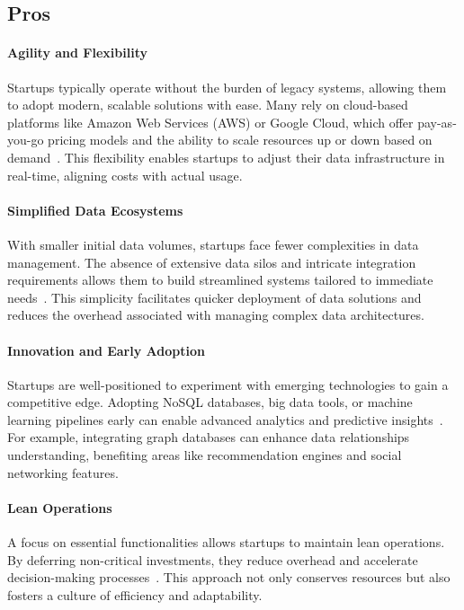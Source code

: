 \documentclass{article}
\begin{document}
\subsection*{Pros}

\paragraph{Agility and Flexibility}
Startups typically operate without the burden of legacy systems, allowing them to adopt modern, scalable solutions with ease. Many rely on cloud-based platforms like Amazon Web Services (AWS) or Google Cloud, which offer pay-as-you-go pricing models and the ability to scale resources up or down based on demand~\cite{aws_pricing}. This flexibility enables startups to adjust their data infrastructure in real-time, aligning costs with actual usage.

\paragraph{Simplified Data Ecosystems}
With smaller initial data volumes, startups face fewer complexities in data management. The absence of extensive data silos and intricate integration requirements allows them to build streamlined systems tailored to immediate needs~\cite{techrepublic_startup_advantage}. This simplicity facilitates quicker deployment of data solutions and reduces the overhead associated with managing complex data architectures.

\paragraph{Innovation and Early Adoption}
Startups are well-positioned to experiment with emerging technologies to gain a competitive edge. Adopting NoSQL databases, big data tools, or machine learning pipelines early can enable advanced analytics and predictive insights~\cite{gartner_trends}. For example, integrating graph databases can enhance data relationships understanding, benefiting areas like recommendation engines and social networking features.

\paragraph{Lean Operations}
A focus on essential functionalities allows startups to maintain lean operations. By deferring non-critical investments, they reduce overhead and accelerate decision-making processes~\cite{ries_lean_startup}. This approach not only conserves resources but also fosters a culture of efficiency and adaptability.
\end{document}
